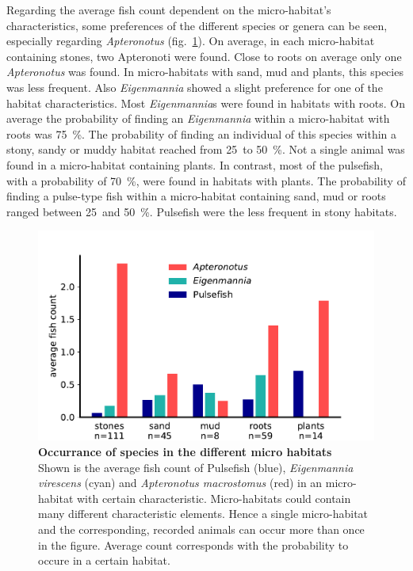 Regarding the average fish count dependent on the micro-habitat's characteristics, some preferences of the different species or genera can be seen, especially regarding \textit{Apteronotus} (fig.~\ref{fig:habitat_count_species}). On average, in each micro-habitat containing stones, two Apteronoti were found. Close to roots on average only one \textit{Apteronotus} was found. In micro-habitats with sand, mud and plants, this species was less frequent.
Also \textit{Eigenmannia} showed a slight preference for one of the habitat characteristics.
Most \textit{Eigenmannia}s were found in habitats with roots. On average the probability of finding an \textit{Eigenmannia} within a micro-habitat with roots was 75~\%. The probability of finding an individual of this species within a stony, sandy or muddy habitat reached from 25~to 50~\%. Not a single animal was found in a micro-habitat containing plants.
In contrast, most of the pulsefish, with a probability of 70~\%, were found in habitats with plants. The probability of finding a pulse-type fish within a micro-habitat containing sand, mud or roots ranged between 25~and 50~\%. Pulsefish were the less frequent in stony habitats.

\begin{figure}[H]
    \centering
    \includegraphics[width = \textwidth]{pictures/Results/average_occuranec_in_habitats.pdf}
    \caption{\textbf{Occurrance of species in the different micro habitats}\\
    Shown is the average fish count of Pulsefish (blue), \textit{Eigenmannia virescens} (cyan) and \textit{Apteronotus macrostomus} (red) in an micro-habitat with certain characteristic. Micro-habitats could contain many different characteristic elements. Hence a single micro-habitat and the corresponding, recorded animals can occur more than once in the figure. Average count corresponds with the probability to occure in a certain habitat.}
    \label{fig:habitat_count_species}
\end{figure}

